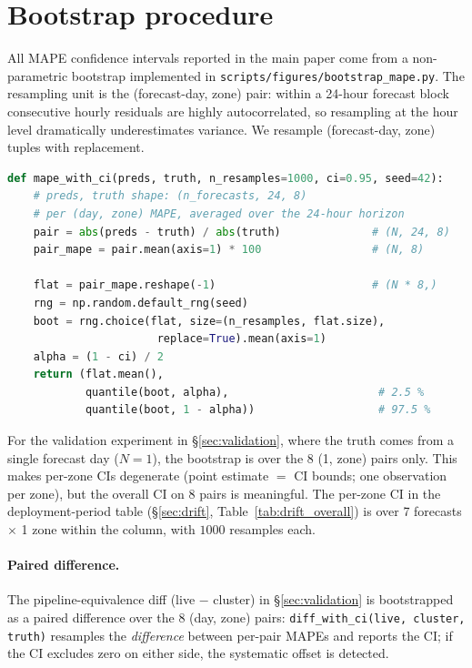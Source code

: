 
\section{Bootstrap procedure}
\label{app:bootstrap}

All MAPE confidence intervals reported in the main paper come from a
non-parametric bootstrap implemented in
\texttt{scripts/figures/bootstrap\_mape.py}. The resampling unit is the
(forecast-day, zone) pair: within a 24-hour forecast block consecutive
hourly residuals are highly autocorrelated, so resampling at the hour
level dramatically underestimates variance. We resample
(forecast-day, zone) tuples with replacement.

\begin{lstlisting}[language=Python, basicstyle=\ttfamily\footnotesize,
                    caption={Bootstrap procedure (paraphrased).},
                    label={lst:bootstrap}]
def mape_with_ci(preds, truth, n_resamples=1000, ci=0.95, seed=42):
    # preds, truth shape: (n_forecasts, 24, 8)
    # per (day, zone) MAPE, averaged over the 24-hour horizon
    pair = abs(preds - truth) / abs(truth)              # (N, 24, 8)
    pair_mape = pair.mean(axis=1) * 100                 # (N, 8)

    flat = pair_mape.reshape(-1)                        # (N * 8,)
    rng = np.random.default_rng(seed)
    boot = rng.choice(flat, size=(n_resamples, flat.size),
                       replace=True).mean(axis=1)
    alpha = (1 - ci) / 2
    return (flat.mean(),
            quantile(boot, alpha),                       # 2.5 %
            quantile(boot, 1 - alpha))                   # 97.5 %
\end{lstlisting}

For the validation experiment in §\ref{sec:validation}, where the
truth comes from a single forecast day ($N = 1$), the bootstrap is over
the 8 (1, zone) pairs only. This makes per-zone CIs degenerate
(point estimate $=$ CI bounds; one observation per zone), but the
overall CI on 8 pairs is meaningful. The per-zone CI in the
deployment-period table (§\ref{sec:drift}, Table~\ref{tab:drift_overall})
is over 7 forecasts $\times$ 1 zone within the column, with $1000$
resamples each.

\paragraph{Paired difference.} The pipeline-equivalence diff (live
$-$ cluster) in §\ref{sec:validation} is bootstrapped as a paired
difference over the 8 (day, zone) pairs:
\texttt{diff\_with\_ci(live, cluster, truth)} resamples the
\emph{difference} between per-pair MAPEs and reports the CI; if the CI
excludes zero on either side, the systematic offset is detected.
